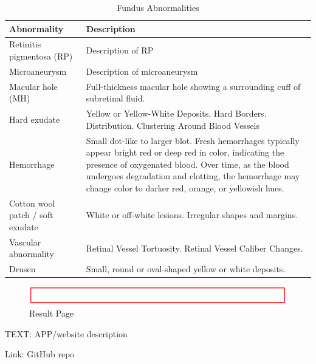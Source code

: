 \documentclass{article}
\begin{document}
	{
		\fontsize{9}{12}\selectfont
		\begin{longtable}{lp{3.8in}}
			\caption{Fundus Abnormalities}
			\label{tb:fundus-ab}\\
			\toprule
			Abnormality&Description\\
			\midrule
			
			\multicolumn{1}{l}{Retinitis pigmentosa (RP)}
			& Description of RP\\
			
			\multicolumn{1}{l}{Microaneurysm}
			& Description of microaneurysm\\
			
			\multicolumn{1}{l}{Macular hole (MH)} & Full-thickness macular hole showing a surrounding cuff of subretinal fluid.\\
			
			\multicolumn{1}{l}{Hard exudate} & Yellow or Yellow-White Deposits.  Hard Borders.  Distribution.  Clustering Around Blood Vessels\\
			
			\multicolumn{1}{l}{Hemorrhage} & Small dot-like to larger blot.  Fresh hemorrhages typically appear bright red or deep red in color, indicating the presence of oxygenated blood. Over time, as the blood undergoes degradation and clotting, the hemorrhage may change color to darker red, orange, or yellowish hues.\\
			
			\multicolumn{1}{l}{Cotton wool patch / soft exudate} & White or off-white lesions.  Irregular shapes and margins.\\
			
			\multicolumn{1}{l}{Vascular abnormality} & Retinal Vessel Tortuosity.  Retinal Vessel Caliber Changes.  \\
			
			\multicolumn{1}{l}{Drusen} & Small, round or oval-shaped yellow or white deposits.\\
			
			\bottomrule
		\end{longtable}
	}
	
	
	\begin{figure}[htbp]
		\centering
		\includegraphics[width=\linewidth]{Figs/Temp.png}
		\caption{Result Page}
		\vspace{0.3cm}
		\label{fig:result_page}
	\end{figure}
	
	TEXT: APP/website description
	
	Link: GitHub repo
	
\end{document}
